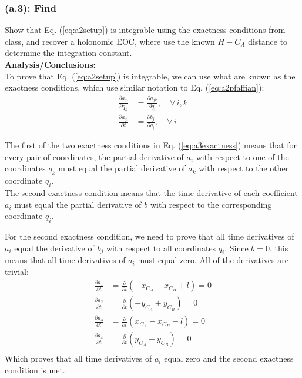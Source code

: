 \documentclass[titlepage]{article}
\begin{document}
\newpage

\subsubsection*{(a.3): Find}
Show that Eq. (\ref{eq:a2setup}) is integrable using the exactness conditions from class, and recover a holonomic EOC, where use the known $H-C_A$ distance to determine the integration constant.\\

\textbf{Analysis/Conclusions:}\\
To prove that Eq. (\ref{eq:a2setup}) is integrable, we can use what are known as the exactness conditions, which use similar notation to Eq. (\ref{eq:a2pfaffian}):
\begin{equation}
	\begin{split}
		\frac{\partial a_{ji}}{\partial q_k} &= \frac{\partial a_{jk}}{\partial q_i}, \quad \forall\, i,k \\
		\frac{\partial a_{ji}}{\partial t} &= \frac{\partial b_j}{\partial q_i}, \quad \forall\, i
	\end{split}
	\label{eq:a3exactness}
\end{equation}

The first of the two exactness conditions in Eq. (\ref{eq:a3exactness}) means that for every pair of coordinates, the partial derivative of $a_i$ with respect to one of the coordinates $q_k$ must equal the partial derivative of $a_k$ with respect to the other coordinate $q_i$.\\

The second exactness condition means that the time derivative of each coefficient $a_i$ must equal the partial derivative of $b$ with respect to the corresponding coordinate $q_i$.\\

\begin{mdframed}[linewidth=1pt, innertopmargin=10pt, innerbottommargin=10pt]
	For the second exactness condition, we need to prove that all time derivatives of $a_i$ equal the derivative of $b_j$ with respect to all coordinates $q_i$. Since $b=0$, this means that all time derivatives of $a_i$ must equal zero. All of the derivatives are trivial:
	\begin{equation}
		\begin{split}
			\frac{\partial a_1}{\partial t} &= \frac{\partial}{\partial t}\left(-x_{C_A}+x_{C_B}+l\right)= 0\\
			\frac{\partial a_2}{\partial t} &= \frac{\partial}{\partial t}\left(-y_{C_A}+y_{C_B}\right)= 0 \\
			\frac{\partial a_3}{\partial t} &= \frac{\partial}{\partial t}\left(x_{C_A}-x_{C_B}-l\right)= 0 \\
			\frac{\partial a_4}{\partial t} &= \frac{\partial}{\partial t}\left(y_{C_A}-y_{C_B}\right)= 0 \\
		\end{split}
	\end{equation}
	Which proves that all time derivatives of $a_i$ equal zero and the second exactness condition is met.
\end{mdframed}
\end{document}
